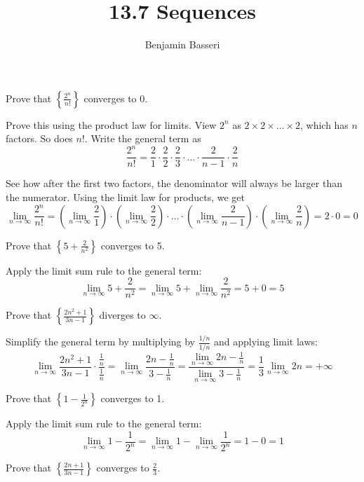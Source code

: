 \documentclass{article}
\title{13.7 Sequences}
\author{Benjamin Basseri}
\begin{document}
\maketitle
\begin{problem}
Prove that $\left\{ \frac{2^n}{n!} \right\}$ converges to 0.
\end{problem}

Prove this using the product law for limits. View $2^n$ as $2 \times 2 \times \ldots \times 2$, which has $n$ factors. So does $n!$. Write the general term as
$$\frac{2^n}{n!} = \frac{2}{1} \cdot \frac{2}{2} \cdot \frac{2}{3} \cdot \ldots \cdot \frac{2}{n-1} \cdot \frac{2}{n}$$

See how after the first two factors, the denominator will always be larger than the numerator. Using the limit law for products, we get
$$\lim_{n\to\infty}\frac{2^n}{n!} = \left(\lim_{n\to\infty}\frac{2}{1}\right) \cdot \left(\lim_{n\to\infty}\frac{2}{2}\right) \cdot \ldots \cdot \left(\lim_{n\to\infty} \frac{2}{n-1}\right) \cdot \left(\lim_{n\to\infty}\frac{2}{n}\right) = 2 \cdot 0 = 0$$

\begin{problem}
Prove that $\left\{5 + \frac{2}{n^2}\right\}$ converges to 5.
\end{problem}

Apply the limit sum rule to the general term:
$$\lim_{n\to\infty} 5 + \frac{2}{n^2} = \lim_{n\to\infty} 5 + \lim_{n\to\infty} \frac{2}{n^2} = 5 + 0 = 5$$

\begin{problem}
Prove that $\left\{ \frac{2n^2 + 1}{3n - 1} \right\}$ diverges to $\infty$.
\end{problem}

Simplify the general term by multiplying by $\frac{1/n}{1/n}$ and applying limit laws:
$$\lim_{n\to\infty} \frac{2n^2 + 1}{3n - 1}\cdot \frac{ \frac{1}{n}}{\frac{1}{n}} = \lim_{n\to\infty} \frac{2n - \frac{1}{n}}{3 - \frac{1}{n}} = \frac{\lim\limits_{n\to\infty}2n - \frac{1}{n}}{\lim\limits_{n\to\infty} 3 - \frac{1}{n}} = \frac{1}{3}\lim_{n\to\infty} 2n = +\infty$$

\begin{problem}
Prove that $\left\{ 1 - \frac{1}{2^n} \right\}$ converges to 1.
\end{problem}

Apply the limit sum rule to the general term:
$$\lim_{n\to\infty} 1 - \frac{1}{2^n} = \lim_{n\to\infty} 1 - \lim_{n\to\infty} \frac{1}{2^n} = 1 - 0 = 1$$

\begin{problem}
Prove that $\left\{ \frac{2n + 1}{3n - 1} \right\}$ converges to $\frac{2}{3}$.
\end{problem}
\end{document}
